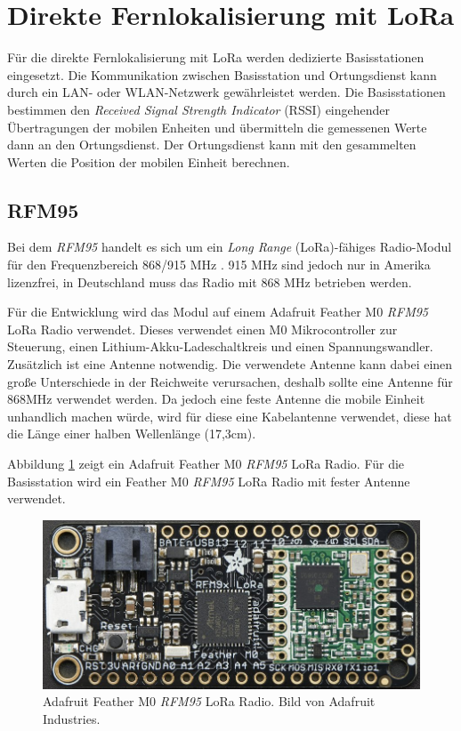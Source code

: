 \section{Direkte Fernlokalisierung mit LoRa}
\label{ch:phase4}
Für die direkte Fernlokalisierung mit LoRa werden dedizierte Basisstationen eingesetzt. 
Die Kommunikation zwischen Basisstation und Ortungsdienst kann durch ein LAN- oder WLAN-Netzwerk gewährleistet werden.
Die Basisstationen bestimmen den \emph{Received Signal Strength Indicator} (RSSI) eingehender Übertragungen der mobilen Enheiten und übermitteln die gemessenen Werte dann an den Ortungsdienst.
Der Ortungsdienst kann mit den gesammelten Werten die Position der mobilen Einheit berechnen.

\subsection{RFM95}
\label{ch:hardwarechanges:sec:rfm95}
Bei dem \emph{RFM95} handelt es sich um ein \emph{Long Range} (LoRa)-fähiges Radio-Modul für den Frequenzbereich 868/915 MHz \cite{hope2006rfm}. 
915 MHz sind jedoch nur in Amerika lizenzfrei, in Deutschland muss das Radio mit 868 MHz betrieben werden.

Für die Entwicklung wird das Modul auf einem Adafruit Feather M0 \emph{RFM95} LoRa Radio verwendet.
Dieses verwendet einen M0 Mikrocontroller zur Steuerung, einen Lithium-Akku-Ladeschaltkreis und einen Spannungswandler.
Zusätzlich ist eine Antenne notwendig. 
Die verwendete Antenne kann dabei einen große Unterschiede in der Reichweite verursachen, deshalb sollte eine Antenne für 868MHz verwendet werden.
Da jedoch eine feste Antenne die mobile Einheit unhandlich machen würde, wird für diese eine Kabelantenne verwendet, diese hat die Länge einer halben Wellenlänge (17,3cm).

Abbildung \ref{fig:lorafeather} zeigt ein Adafruit Feather M0 \emph{RFM95} LoRa Radio. 
Für die Basisstation wird ein Feather M0 \emph{RFM95} LoRa Radio mit fester Antenne verwendet.

\begin{figure}[h]
  \centering
	\includegraphics[width=\textwidth]{images/loraada.png}
  \caption{Adafruit Feather M0 \emph{RFM95} LoRa Radio. Bild von Adafruit Industries\protect \footnotemark.}
  \label{fig:lorafeather}
\end{figure}

